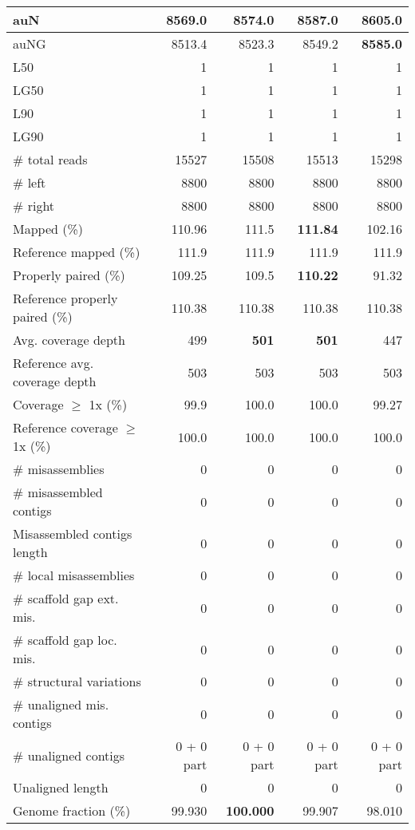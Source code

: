 \documentclass[12pt,a4paper]{article}
\begin{document}
\begin{table}[ht]
\begin{center}
\begin{tabular}{|l*{4}{|r}|}
auN & 8569.0 & 8574.0 & 8587.0 & {\bf 8605.0} \\ \hline
auNG & 8513.4 & 8523.3 & 8549.2 & {\bf 8585.0} \\ \hline
L50 & 1 & 1 & 1 & 1 \\ \hline
LG50 & 1 & 1 & 1 & 1 \\ \hline
L90 & 1 & 1 & 1 & 1 \\ \hline
LG90 & 1 & 1 & 1 & 1 \\ \hline
\# total reads & 15527 & 15508 & 15513 & 15298 \\ \hline
\# left & 8800 & 8800 & 8800 & 8800 \\ \hline
\# right & 8800 & 8800 & 8800 & 8800 \\ \hline
Mapped (\%) & 110.96 & 111.5 & {\bf 111.84} & 102.16 \\ \hline
Reference mapped (\%) & 111.9 & 111.9 & 111.9 & 111.9 \\ \hline
Properly paired (\%) & 109.25 & 109.5 & {\bf 110.22} & 91.32 \\ \hline
Reference properly paired (\%) & 110.38 & 110.38 & 110.38 & 110.38 \\ \hline
Avg. coverage depth & 499 & {\bf 501} & {\bf 501} & 447 \\ \hline
Reference avg. coverage depth & 503 & 503 & 503 & 503 \\ \hline
Coverage $\geq$ 1x (\%) & 99.9 & 100.0 & 100.0 & 99.27 \\ \hline
Reference coverage $\geq$ 1x (\%) & 100.0 & 100.0 & 100.0 & 100.0 \\ \hline
\# misassemblies & 0 & 0 & 0 & 0 \\ \hline
\# misassembled contigs & 0 & 0 & 0 & 0 \\ \hline
Misassembled contigs length & 0 & 0 & 0 & 0 \\ \hline
\# local misassemblies & 0 & 0 & 0 & 0 \\ \hline
\# scaffold gap ext. mis. & 0 & 0 & 0 & 0 \\ \hline
\# scaffold gap loc. mis. & 0 & 0 & 0 & 0 \\ \hline
\# structural variations & 0 & 0 & 0 & 0 \\ \hline
\# unaligned mis. contigs & 0 & 0 & 0 & 0 \\ \hline
\# unaligned contigs & 0 + 0 part & 0 + 0 part & 0 + 0 part & 0 + 0 part \\ \hline
Unaligned length & 0 & 0 & 0 & 0 \\ \hline
Genome fraction (\%) & 99.930 & {\bf 100.000} & 99.907 & 98.010 \\ \hline

\end{tabular}
\end{center}
\end{table}
\end{document}
